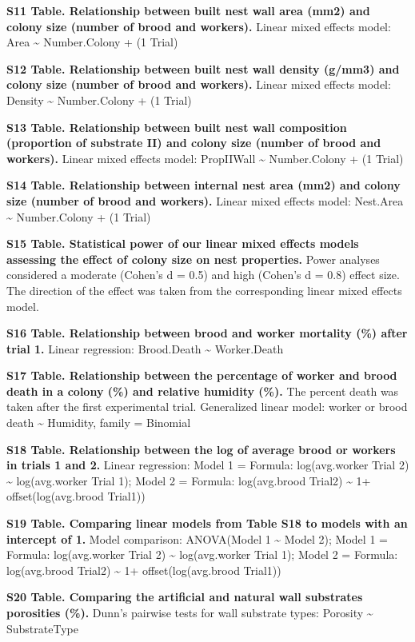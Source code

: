 \documentclass[3p]{elsarticle} %
\begin{document}
\textbf{S11 Table. Relationship between built nest wall area (mm2) and
colony size (number of brood and workers).} Linear mixed effects model:
Area \textasciitilde{} Number.Colony + (1 \textbar{} Trial)

\textbf{S12 Table. Relationship between built nest wall density (g/mm3)
and colony size (number of brood and workers).} Linear mixed effects
model: Density \textasciitilde{} Number.Colony + (1 \textbar{} Trial)

\textbf{S13 Table. Relationship between built nest wall composition
(proportion of substrate II) and colony size (number of brood and
workers).} Linear mixed effects model: PropIIWall \textasciitilde{}
Number.Colony + (1 \textbar{} Trial)

\textbf{S14 Table. Relationship between internal nest area (mm2) and
colony size (number of brood and workers).} Linear mixed effects model:
Nest.Area \textasciitilde{} Number.Colony + (1 \textbar{} Trial)

\textbf{S15 Table. Statistical power of our linear mixed effects models
assessing the effect of colony size on nest properties.} Power analyses
considered a moderate (Cohen's d = 0.5) and high (Cohen's d = 0.8)
effect size. The direction of the effect was taken from the
corresponding linear mixed effects model.

\textbf{S16 Table. Relationship between brood and worker mortality (\%)
after trial 1.} Linear regression: Brood.Death \textasciitilde{}
Worker.Death

\textbf{S17 Table. Relationship between the percentage of worker and
brood death in a colony (\%) and relative humidity (\%).} The percent
death was taken after the first experimental trial. Generalized linear
model: worker or brood death \textasciitilde{} Humidity, family =
Binomial

\textbf{S18 Table. Relationship between the log of average brood or
workers in trials 1 and 2.} Linear regression: Model 1 = Formula:
log(avg.worker Trial 2) \textasciitilde{} log(avg.worker Trial 1); Model
2 = Formula: log(avg.brood Trial2) \textasciitilde{} 1+
offset(log(avg.brood Trial1))

\textbf{S19 Table. Comparing linear models from Table S18 to models with
an intercept of 1.} Model comparison: ANOVA(Model 1 \textasciitilde{}
Model 2); Model 1 = Formula: log(avg.worker Trial 2) \textasciitilde{}
log(avg.worker Trial 1); Model 2 = Formula: log(avg.brood Trial2)
\textasciitilde{} 1+ offset(log(avg.brood Trial1))

\textbf{S20 Table. Comparing the artificial and natural wall substrates
porosities (\%).} Dunn's pairwise tests for wall substrate types:
Porosity \textasciitilde{} SubstrateType
\end{document}
